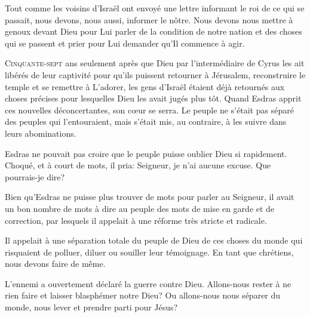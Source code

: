 Tout comme les voisins d'Israël ont envoyé une lettre informant
 le roi de ce qui se passait, nous devons, nous aussi, informer le nôtre.
 Nous devons nous mettre à genoux devant Dieu pour Lui parler de la condition
 de notre nation et des choses qui se passent \ocadr{}et prier pour Lui demander
 qu'Il commence à agir. 

\dvrule







\lettrine{C}{inquante-sept} ans seulement après que Dieu
 \ocadr{}par l'intermédiaire de Cyrus\fcadr{} les ait libérés de leur captivité
 pour qu'ils puissent retourner à Jérusalem,
 reconstruire le temple et se remettre à L'adorer,
 les gens d'Israël étaient déjà retournés aux choses précises
 pour lesquelles Dieu les avait jugés plus tôt.
 Quand Esdras apprit ces nouvelles déconcertantes, son c\oe{}ur se serra.
 Le peuple ne s'était pas séparé des peuples qui l'entouraient,
 mais s'était mis, au contraire, à les suivre dans leurs abominations.

Esdras ne pouvait pas croire que le peuple puisse oublier Dieu si rapidement.
 Choqué, et à court de mots, il pria: \Og Seigneur, je n'ai aucune excuse.
 Que pourrais-je dire? \Fg{}

Bien qu'Esdras ne puisse plus trouver de mots pour parler au Seigneur,
 il avait un bon nombre de mots à dire au peuple \ocadr{}des mots de mise en garde
 et de correction, par lesquels il appelait à une réforme très stricte
 et radicale.

Il appelait à une séparation totale du peuple de Dieu de ces choses du monde
 qui risquaient de polluer, diluer ou souiller leur témoignage.
 En tant que chrétiens, nous devons faire de même. 



L'ennemi a ouvertement déclaré la guerre contre Dieu.
 Allons-nous rester à ne rien faire et laisser blasphémer notre Dieu?
 Ou allons-nous nous séparer du monde, nous lever et prendre parti pour Jésus? 

